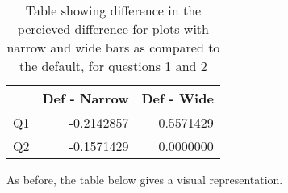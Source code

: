 \documentclass[
]{article}
\newenvironment{Shaded}{\begin{snugshade}}{\end{snugshade}}
\newcommand{\DataTypeTok}[1]{\textcolor[rgb]{0.13,0.29,0.53}{#1}}
\newcommand{\KeywordTok}[1]{\textcolor[rgb]{0.13,0.29,0.53}{\textbf{#1}}}
\newcommand{\NormalTok}[1]{#1}
\newcommand{\OperatorTok}[1]{\textcolor[rgb]{0.81,0.36,0.00}{\textbf{#1}}}
\newcommand{\StringTok}[1]{\textcolor[rgb]{0.31,0.60,0.02}{#1}}
\begin{document}
\begin{Shaded}
\end{Shaded}

\begin{table}[!h]

\caption{\label{tab:unnamed-chunk-33}Table showing difference in the percieved difference for plots with narrow and wide bars as compared to the default, for questions 1 and 2}
\centering
\begin{tabular}[t]{l|r|r}
\hline
  & Def - Narrow & Def - Wide\\
\hline
Q1 & -0.2142857 & 0.5571429\\
\hline
Q2 & -0.1571429 & 0.0000000\\
\hline
\end{tabular}
\end{table}

As before, the table below gives a visual representation.
\end{document}
